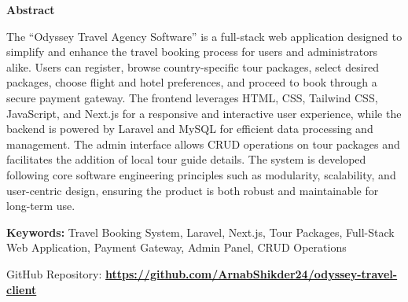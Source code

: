 \thispagestyle{plain}
\begin{center}
    \LARGE{\textbf{Abstract}}
\end{center}
The “Odyssey Travel Agency Software” is a full-stack web application designed to simplify and enhance the travel booking process for users and administrators alike. Users can register, browse country-specific tour packages, select desired packages, choose flight and hotel preferences, and proceed to book through a secure payment gateway. The frontend leverages HTML, CSS, Tailwind CSS, JavaScript, and Next.js for a responsive and interactive user experience, while the backend is powered by Laravel and MySQL for efficient data processing and management. The admin interface allows CRUD operations on tour packages and facilitates the addition of local tour guide details. The system is developed following core software engineering principles such as modularity, scalability, and user-centric design, ensuring the product is both robust and maintainable for long-term use.

\textbf{Keywords:} Travel Booking System, Laravel, Next.js, Tour Packages, Full-Stack Web Application, Payment Gateway, Admin Panel, CRUD Operations

\vspace{0.5cm}

\noindent GitHub Repository:
\href{https://github.com/ArnabShikder24/odyssey-travel-client}{\textbf{https://github.com/ArnabShikder24/odyssey-travel-client}} 

